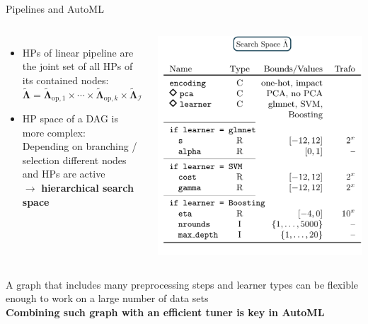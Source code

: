 \begin{vbframe}{Pipelines and AutoML}
\begin{columns}
\begin{itemize}
    \item HPs of linear pipeline are the joint set of all HPs of its contained nodes:\\
    $\tilde{\bm\Lambda}=\tilde{\bm\Lambda}_{\mathrm{op}, 1} \times \cdots \times \tilde{\bm\Lambda}_{\mathrm{op}, k} \times \tilde{\bm\Lambda}_{\mathcal{I}}$
    \item HP space of a DAG is more complex:\\
    Depending on branching / selection different nodes and HPs are active\\ $\rightarrow$ \textbf{hierarchical search space}
\end{itemize}
\begin{center}
\includegraphics[width = \textwidth]{figure_man/pipeline_with_param_table_II.png}
\end{center}
\end{columns}%
\vspace{1em}

A graph that includes many preprocessing steps and learner types can be flexible enough to work on a large number of data sets\\
\vspace{1em}
\textbf{Combining such graph with an efficient tuner is key in AutoML}
\end{vbframe}


